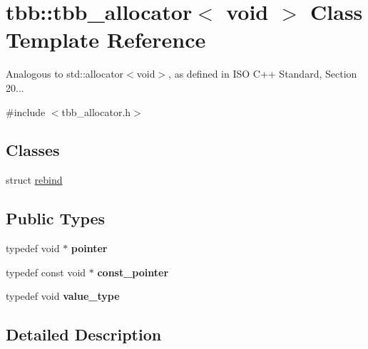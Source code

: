 \hypertarget{classtbb_1_1tbb__allocator_3_01void_01_4}{}\section{tbb\+:\+:tbb\+\_\+allocator$<$ void $>$ Class Template Reference}
\label{classtbb_1_1tbb__allocator_3_01void_01_4}


Analogous to std\+::allocator$<$void$>$, as defined in I\+S\+O C++ Standard, Section 20...  




{\ttfamily \#include $<$tbb\+\_\+allocator.\+h$>$}

\subsection*{Classes}
\begin{DoxyCompactItemize}
\item 
struct \hyperlink{structtbb_1_1tbb__allocator_3_01void_01_4_1_1rebind}{rebind}
\end{DoxyCompactItemize}
\subsection*{Public Types}
\begin{DoxyCompactItemize}
\item 
\hypertarget{classtbb_1_1tbb__allocator_3_01void_01_4_a8fda536620d85d53caa82c45ffa49dd8}{}typedef void $\ast$ {\bfseries pointer}\label{classtbb_1_1tbb__allocator_3_01void_01_4_a8fda536620d85d53caa82c45ffa49dd8}

\item 
\hypertarget{classtbb_1_1tbb__allocator_3_01void_01_4_a401d3c91a38b09410a20fe69d4d9745d}{}typedef const void $\ast$ {\bfseries const\+\_\+pointer}\label{classtbb_1_1tbb__allocator_3_01void_01_4_a401d3c91a38b09410a20fe69d4d9745d}

\item 
\hypertarget{classtbb_1_1tbb__allocator_3_01void_01_4_afef43ed21663982050fbae7b970e33f6}{}typedef void {\bfseries value\+\_\+type}\label{classtbb_1_1tbb__allocator_3_01void_01_4_afef43ed21663982050fbae7b970e33f6}

\end{DoxyCompactItemize}


\subsection{Detailed Description}
